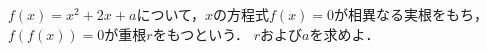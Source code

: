 \documentclass[../../main.tex]{subfiles}
\begin{document}
$f(x)=x^2+2x+a$について，$x$の方程式$f(x)=0$が相異なる実根をもち，
$f(f(x))=0$が重根$r$をもつという．
$r$および$a$を求めよ．
\end{document}

